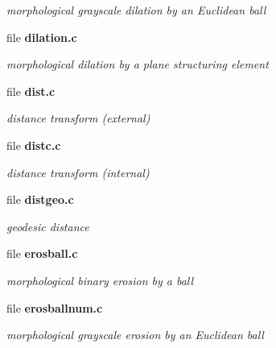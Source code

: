 \begin{DoxyCompactItemize}
\begin{DoxyCompactList}\small\item\em morphological grayscale dilation by an Euclidean ball \item\end{DoxyCompactList}

\item 
file {\bf dilation.c}


\begin{DoxyCompactList}\small\item\em morphological dilation by a plane structuring element \item\end{DoxyCompactList}

\item 
file {\bf dist.c}


\begin{DoxyCompactList}\small\item\em distance transform (external) \item\end{DoxyCompactList}

\item 
file {\bf distc.c}


\begin{DoxyCompactList}\small\item\em distance transform (internal) \item\end{DoxyCompactList}

\item 
file {\bf distgeo.c}


\begin{DoxyCompactList}\small\item\em geodesic distance \item\end{DoxyCompactList}

\item 
file {\bf erosball.c}


\begin{DoxyCompactList}\small\item\em morphological binary erosion by a ball \item\end{DoxyCompactList}

\item 
file {\bf erosballnum.c}


\begin{DoxyCompactList}\small\item\em morphological grayscale erosion by an Euclidean ball \item\end{DoxyCompactList}


\end{DoxyCompactItemize}

